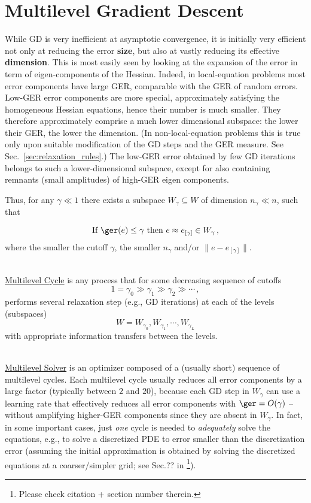 \documentclass{article} %
\begin{document}
\section{Multilevel Gradient Descent}
\label{sec:mlgd}
While GD is very inefficient at asymptotic convergence, it is initially very efficient not only at reducing the error \textbf{size}, but also at vastly reducing its effective \textbf{dimension}. This is most easily seen by looking at the expansion of the error in term of eigen-components of the Hessian. Indeed, in local-equation problems most error components have large GER, comparable with the GER of random errors. Low-GER error components are more special, approximately satisfying the homogeneous Hessian equations, hence their number is much smaller. They therefore approximately comprise a much lower dimensional subspace: the lower their GER, the lower the dimension. (In non-local-equation problems this is true only upon suitable modification of the GD steps and the GER measure. See Sec.~\ref{sec:relaxation_rules}.)  The low-GER error obtained by few GD iterations belongs to such a lower-dimensional subspace, except for also containing remnants (small amplitudes) of high-GER eigen components.  

Thus, for any $\gamma \ll 1$ there exists a subspace $W_{\gamma} \subseteq W$ of dimension $n_{\gamma} \ll n$, such that

\begin{equation}
	{\mbox{If }} \ger(e) \leq \gamma {\mbox{ then }} e \approx e_{[\gamma]} \in W_{\gamma}\,,
	\label{ger_gamma}
\end{equation}
where the smaller the cutoff $\gamma$, the smaller $n_{\gamma}$ and/or $\|e -e_{[\gamma]}\|$.

{\mbox{}}\\ \noindent
\underline{Multilevel Cycle} is any process that for some decreasing sequence of cutoffs
$$
1 = \gamma_0 \gg \gamma_1 \gg \gamma_2 \gg \cdots\,,
$$
performs several relaxation step (e.g., GD iterations) at each of the levels (subspaces)
$$ W = W_{\gamma_0}, W_{\gamma_1}, \cdots, W_{\gamma_L} $$
with appropriate information transfers between the levels.

{\mbox{}}\\
\underline{Multilevel Solver} is an optimizer composed of a (usually short) sequence of multilevel cycles. Each multilevel cycle usually reduces all error components by a large factor (typically between $2$ and $20$), because each  GD step in $W_{\gamma}$ can use a learning rate that effectively reduces all error components with $\ger = O(\gamma)$ -- without amplifying higher-GER components since they are absent in $W_{\gamma}$. In fact, in some important cases, just {\it one} cycle is needed to {\it adequately} solve the equations, e.g., to solve a discretized PDE to error smaller than the discretization error (assuming the initial approximation is obtained by solving the discretized equations at a coarser/simpler grid; see Sec.?? in \cite{guide}\footnote{Please check citation + section number therein.}).
\end{document}
